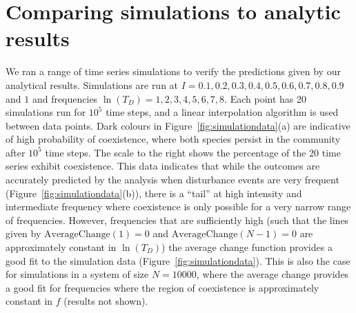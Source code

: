 \documentclass[a4paper]{article}
\begin{document}
   \section{Comparing simulations to analytic results}
   \label{app:simcompare}
   We ran a range of time series simulations to verify the predictions given by our analytical results. Simulations are run at $I=0.1,0.2,0.3,0.4,0.5,0.6,0.7,0.8,0.9$ and $1$ and frequencies $\ln(T_D)=1,2,3,4,5,6,7,8$. Each point has 20 simulations run for $10^5$ time steps, and a linear interpolation algorithm is used between data points. Dark colours in Figure~\ref{fig:simulationdata}(a) are indicative of high probability of coexistence, where both species persist in the community after $10^5$ time steps. The scale to the right shows the percentage of the 20 time series exhibit coexistence. This data indicates that while the outcomes are accurately predicted by the analysis when disturbance events are very frequent (Figure~\ref{fig:simulationdata}(b)), there is a ``tail'' at high intensity and intermediate frequency where coexistence is only possible for a very narrow range of frequencies. However, frequencies that are sufficiently high (such that the lines given by $\text{AverageChange}(1)=0$ and $\text{AverageChange}(N-1)=0$  are approximately constant in $\ln(T_D)$) the average change function provides a good fit to the simulation data (Figure~\ref{fig:simulationdata}). This is also the case for simulations in a system of size $N=10000$, where the average change provides a good fit for frequencies where the region of coexistence is approximately constant in $f$ (results not shown).
\end{document}
